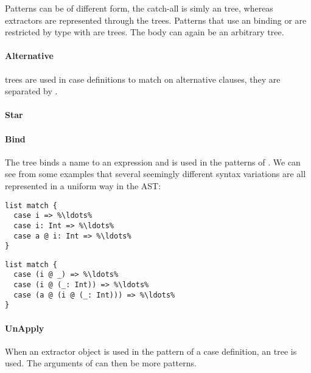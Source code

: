 Patterns can be of different form, the catch-all \src{\_} is simly an  tree, whereas extractors are represented through the  trees. Patterns that use an  binding or are restricted by type with \src{:} are  trees. The body can again be an arbitrary tree.

\paragraph{Alternative} 

\noindent {} trees are used in case definitions to match on alternative clauses, they are separated by \src{|}.

\paragraph{Star} 

\paragraph{Bind} 

\noindent The  tree binds a name to an expression and is used in the patterns of . We can see from some examples that several seemingly different syntax variations are all represented in a uniform way in the AST:

\begin{multicols}{2}
\begin{lstlisting}
list match {
  case i => %\ldots%
  case i: Int => %\ldots%
  case a @ i: Int => %\ldots%
}
\end{lstlisting}
\begin{lstlisting}
list match {
  case (i @ _) => %\ldots%
  case (i @ (_: Int)) => %\ldots%
  case (a @ (i @ (_: Int))) => %\ldots% 
}
\end{lstlisting}
\end{multicols}

\paragraph{UnApply} 

\noindent When an extractor object is used in the pattern of a case definition, an  tree is used. The arguments of  can then be more  patterns.

